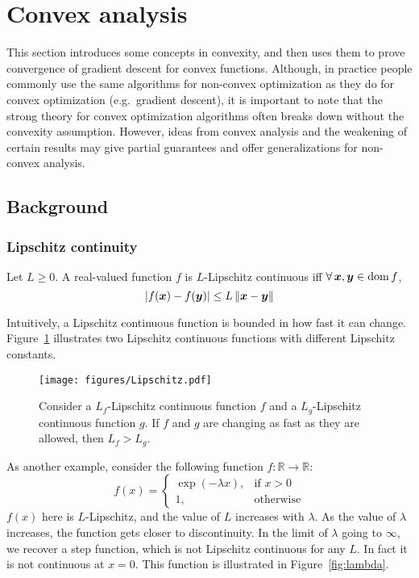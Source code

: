 \documentclass{article}
\begin{document}
\section{Convex analysis}
\label{sec:convexAnalysis}
This section introduces some concepts in convexity, and then uses them to prove convergence of gradient descent for convex functions.
Although, in practice people commonly use the same algorithms for non-convex optimization as they do for convex optimization (e.g.\ gradient descent), it is important to note that the strong theory for convex optimization algorithms often breaks down without the convexity assumption. 
However, ideas from convex analysis and the weakening of certain results may give partial guarantees and offer generalizations for non-convex analysis.

\subsection{Background}
\label{subsec:convexAnalysis:background}
\subsubsection{Lipschitz continuity}
\label{subsubsec:convexAnalysis:background:lipschitzContinuity}
\begin{defn}
Let $L\geq 0$. A real-valued function $f$ is $L$-Lipschitz continuous iff $\forall \vx, \vy \in \dom f$,
\[
	\left| f({\bm{x}}) - f({\bm{y}}) \right| \leq L\left\|{\bm{x}}-{\bm{y}}\right\|
\]
\end{defn}

Intuitively, a Lipschitz continuous function is bounded in how fast it can change. Figure~\ref{fig:lipschitz} illustrates two Lipschitz continuous functions with different Lipschitz constants.

\begin{figure}[ht]
\centering
    \texttt{[image: figures/Lipschitz.pdf]}
    \caption{Consider a $L_f$-Lipschitz continuous function $f$ and a $L_g$-Lipschitz continuous function $g$. If $f$ and $g$ are changing as fast as they are allowed, then $L_f > L_g$.}
    \label{fig:lipschitz}
\end{figure}


As another example, consider the following function $f:\mathbb{R}\to\mathbb{R}$:
\[
    f(x) = 
    \begin{cases}
        \exp(-\lambda x), & \text{if } x > 0\\
        1,                & \text{otherwise}
    \end{cases}
\]
$f(x)$ here is $L$-Lipschitz, and the value of $L$ increases with $\lambda$.
As the value of $\lambda$ increases, the function gets closer to discontinuity.
In the limit of $\lambda$ going to $\infty$, we recover a step function, which is not Lipschitz continuous for any $L$.
In fact it is not continuous at $x=0$.
This function is illustrated in Figure~\ref{fig:lambda}.
\end{document}
